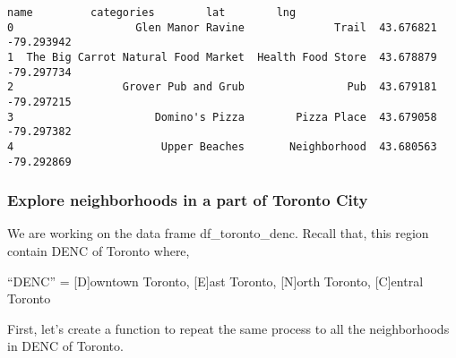 \documentclass[11pt]{article}
\makeatletter
\newcommand{\boxspacing}{\kern\kvtcb@left@rule\kern\kvtcb@boxsep}
\newcommand{\prompt}[4]{
        \ttfamily\llap{{\color{#2}[#3]:\hspace{3pt}#4}}\vspace{-\baselineskip}
    }
\makeatother
\begin{document}
            \begin{tcolorbox}[breakable, size=fbox, boxrule=.5pt, pad at break*=1mm, opacityfill=0]
\prompt{Out}{outcolor}{33}{\boxspacing}
\begin{Verbatim}[commandchars=\\\{\}]
                                 name         categories        lat        lng
0                   Glen Manor Ravine              Trail  43.676821 -79.293942
1  The Big Carrot Natural Food Market  Health Food Store  43.678879 -79.297734
2                 Grover Pub and Grub                Pub  43.679181 -79.297215
3                      Domino's Pizza        Pizza Place  43.679058 -79.297382
4                       Upper Beaches       Neighborhood  43.680563 -79.292869
\end{Verbatim}
\end{tcolorbox}
        
    \hypertarget{explore-neighborhoods-in-a-part-of-toronto-city}{%
\subsubsection{Explore neighborhoods in a part of Toronto
City}\label{explore-neighborhoods-in-a-part-of-toronto-city}}

We are working on the data frame df\_toronto\_denc. Recall that, this
region contain DENC of Toronto where,

``DENC'' = {[}D{]}owntown Toronto, {[}E{]}ast Toronto, {[}N{]}orth
Toronto, {[}C{]}entral Toronto

First, let's create a function to repeat the same process to all the
neighborhoods in DENC of Toronto.
\end{document}
